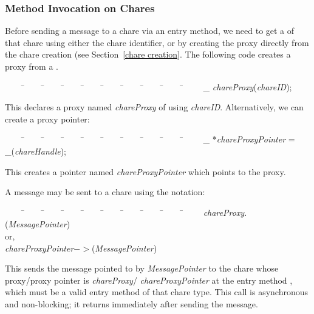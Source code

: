\subsubsection{Method Invocation on Chares}

Before sending a message to a chare via an
entry method, we need to get a  of
that chare using either the chare identifier, or by creating the
proxy directly from the chare creation (see Section~\ref{chare
creation}. The following code creates a proxy from a
.

\begin{tabbing} ~~~~ \=~~~~ \=~~~~ \=~~~~ \=~~~~ \=~~~~ \=~~~~ \=~~~~ \=~~~~
\=~~~~ \kill \> \_ {\it chareProxy}({\it chareID});
\end{tabbing}

This declares a proxy named {\it chareProxy} of  using {\it
chareID}.  Alternatively, we can create a proxy pointer:

\begin{tabbing} ~~~~ \=~~~~ \=~~~~ \=~~~~ \=~~~~ \=~~~~ \=~~~~ \=~~~~ \=~~~~
\=~~~~ \kill \> \_ *{\it chareProxyPointer} = \_({\it chareHandle}); \end{tabbing}

This creates a pointer named {\it chareProxyPointer} which points to the proxy. 

A message  may be sent to a chare using the
notation:

\begin{tabbing} ~~~~ \=~~~~ \=~~~~ \=~~~~ \=~~~~ \=~~~~ \=~~~~ \=~~~~ \=~~~~
\=~~~~ \kill \> {\it chareProxy}$.$({\it MessagePointer}) \\ \>
\> or, \\ \> {\it chareProxyPointer}$->$({\it MessagePointer})
\end{tabbing}

This sends the message pointed to by {\it MessagePointer} to the
chare whose proxy/proxy pointer is {\it chareProxy}/{\it
chareProxyPointer} at the entry method ,
which must be a valid entry method of that chare type. This call
is asynchronous and non-blocking; it returns immediately after sending the
message. 
